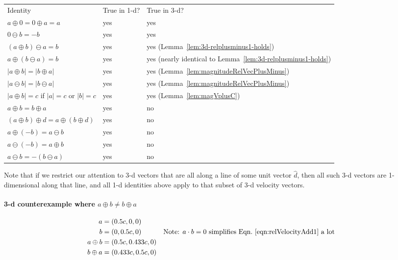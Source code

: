 \documentclass[a4paper]{article}
\theoremstyle{plain}
\theoremstyle{definition}
\newcommand{\hatvec}[1]{\hat{#1}}
\begin{document}
\begin{center}
\begin{tabularx}{1.0\textwidth}{|p{4cm}|p{2cm}|p{3cm}|}
\cline{1-3} \\
Identity & True in 1-d? & True in 3-d?
\\ \cline{1-3}
$a \oplus 0 = 0 \oplus a = a$ & yes & yes
\\ \cline{1-3}
$0 \ominus b = -b$ & yes & yes
\\ \cline{1-3}
$(a \oplus b) \ominus a = b$ & yes & yes (Lemma~\ref{lem:3d-relplusminus1-holds})
\\ \cline{1-3}
$a \oplus (b \ominus a) = b$ & yes & yes (nearly identical to Lemma~\ref{lem:3d-relplusminus1-holds})
\\ \cline{1-3}
$|a \oplus b|=|b \oplus a|$ & yes & yes (Lemma~\ref{lem:magnitudeRelVecPlusMinus})
\\ \cline{1-3}
$|a \ominus b|=|b \ominus a|$ & yes & yes (Lemma~\ref{lem:magnitudeRelVecPlusMinus})
\\ \cline{1-3}
$|a \oplus b| = c$ if $|a|=c$ or $|b|=c$ & yes & yes (Lemma~\ref{lem:magVplusC})
\\ \cline{1-3}
$a \oplus b = b \oplus a$ & yes & no
\\ \cline{1-3}
$(a \oplus b) \oplus d = a \oplus (b \oplus d)$ & yes & no
\\ \cline{1-3}
$a \oplus (-b) = a \ominus b$ & yes & no
\\ \cline{1-3}
$a \ominus (-b) = a \oplus b$ & yes & no
\\ \cline{1-3}
$a \ominus b = - (b \ominus a)$ & yes & no
\\ \cline{1-3}
\end{tabularx}
\end{center}

Note that if we restrict our attention to 3-d vectors that are all
along a line of some unit vector $\hatvec{d}$, then all such 3-d
vectors are 1-dimensional along that line, and all 1-d identities
above apply to that subset of 3-d velocity vectors.

\paragraph{3-d counterexample where $a \oplus b \neq b \oplus a$}
\begin{align*}
  a & = (0.5c, 0, 0) \\
  b & = (0, 0.5c, 0) & & \text{Note: $a \cdot b = 0$ simplifies Eqn.~\eqref{eqn:relVelocityAdd1} a lot} \\
  a \oplus b & = (0.5c, 0.433c, 0) \\
  b \oplus a & = (0.433c, 0.5c, 0)
\end{align*}
\end{document}
